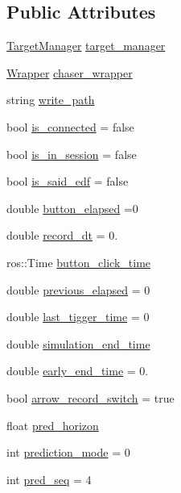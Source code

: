 \subsection*{Public Attributes}
\begin{DoxyCompactItemize}
\item 
\hyperlink{class_target_manager}{Target\+Manager} \hyperlink{class_q_node_adc66765125dfd755d5e7f0c0eb6e6395}{target\+\_\+manager}
\item 
\hyperlink{class_wrapper}{Wrapper} \hyperlink{class_q_node_ad2d828488fb632a008c7d3ee0e1d1fa2}{chaser\+\_\+wrapper}
\item 
string \hyperlink{class_q_node_a0967d1922eeb7e39eedca309c7003d23}{write\+\_\+path}
\item 
bool \hyperlink{class_q_node_a98b08e7704b00df8648f8c08dffe950c}{is\+\_\+connected} = false
\item 
bool \hyperlink{class_q_node_a6ace2d0aa89adecfe699b3f1c3ce0b0f}{is\+\_\+in\+\_\+session} = false
\item 
bool \hyperlink{class_q_node_a9db73b60d8ffd6ac1e64ab5620f2db49}{is\+\_\+said\+\_\+edf} = false
\item 
double \hyperlink{class_q_node_a2893bbeba854c1cc89d2271804325b7b}{button\+\_\+elapsed} =0
\item 
double \hyperlink{class_q_node_ad1f3252201b932fc5d39b4f80349c7e2}{record\+\_\+dt} = 0.
\item 
ros\+::\+Time \hyperlink{class_q_node_a96e6599c14732ded065ae6a5b004f872}{button\+\_\+click\+\_\+time}
\item 
double \hyperlink{class_q_node_a4b5f0a40821fbb176de620cb5a3921f7}{previous\+\_\+elapsed} = 0
\item 
double \hyperlink{class_q_node_a932e8eb11684f38ae2fb3f23639b7c70}{last\+\_\+tigger\+\_\+time} = 0
\item 
double \hyperlink{class_q_node_a7a127726e48aa5bde733d715af7a744c}{simulation\+\_\+end\+\_\+time}
\item 
double \hyperlink{class_q_node_a6e6b7e12d0d9bbc230cc9dc42a2bd087}{early\+\_\+end\+\_\+time} = 0.
\item 
bool \hyperlink{class_q_node_ada91a6275708099206c452df47210045}{arrow\+\_\+record\+\_\+switch} = true
\item 
float \hyperlink{class_q_node_a3430f5db8c773c840b76794c82a9d58f}{pred\+\_\+horizon}
\item 
int \hyperlink{class_q_node_a5d5139bf1420415b2e0c2b0e52db957e}{prediction\+\_\+mode} = 0
\item 
int \hyperlink{class_q_node_aed4571afa880dc86a88b229c6517bfa1}{pred\+\_\+seq} = 4
\end{DoxyCompactItemize}
